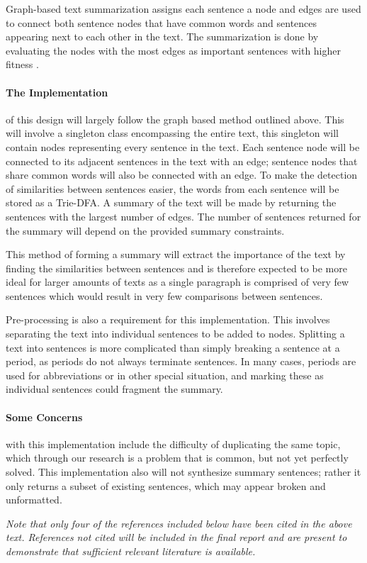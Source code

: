 \documentclass{article}
\begin{document}
	Graph-based text summarization assigns each sentence a node and edges are used to connect both sentence nodes that have common words and sentences appearing next to each other in the text. The summarization is done by evaluating the nodes with the most edges as important sentences with higher fitness \cite{art4}.
	
	\paragraph{The Implementation} of this design will largely follow the graph based method outlined above. This will involve a singleton class encompassing the entire text, this singleton will contain nodes representing every sentence in the text. Each sentence node will be connected to its adjacent sentences in the text with an edge; sentence nodes that share common words will also be connected with an edge. To make the detection of similarities between sentences easier, the words from each sentence will be stored as a Trie-DFA. A summary of the text will be made by returning the sentences with the largest number of edges. The number of sentences returned for the summary will depend on the provided summary constraints. 
	
	This method of forming a summary will extract the importance of the text by finding the similarities between sentences and is therefore expected to be more ideal for larger amounts of texts as a single paragraph is comprised of very few sentences which would result in very few comparisons between sentences. 
	
	Pre-processing is also a requirement for this implementation. This involves separating the text into individual sentences to be added to nodes. Splitting a text into sentences is more complicated than simply breaking a sentence at a period, as periods do not always terminate sentences. In many cases, periods are used for abbreviations or in other special situation, and marking these as individual sentences could fragment the summary.
	
	\paragraph{Some Concerns} with this implementation include the difficulty of duplicating the same topic, which through our research is a problem that is common, but not yet perfectly solved. This implementation also will not synthesize summary sentences; rather it only returns a subset of existing sentences, which may appear broken and unformatted.
	
	\medskip 
	
	{\em
		Note that only four of the references included below have been cited in the above text. References not cited will be included in the final report and are present to demonstrate that sufficient relevant literature is available.
	}
	
	\nocite{*}
	\printbibliography
\end{document}
